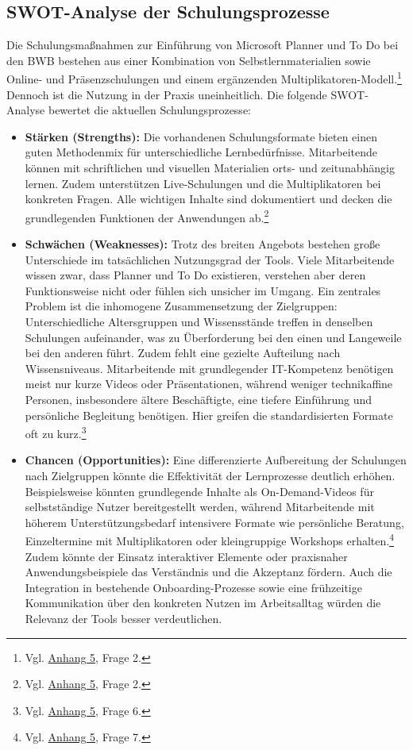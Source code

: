 \documentclass[
    12pt, 
    a4paper,
    ]{scrartcl} %
\begin{document}
\subsection{SWOT-Analyse der Schulungsprozesse}
Die Schulungsmaßnahmen zur Einführung von Microsoft Planner und To Do bei den BWB bestehen aus einer Kombination von Selbstlernmaterialien sowie Online- und Präsenzschulungen und einem ergänzenden Multiplikatoren-Modell.\footnote{Vgl. \hyperref[sec:Anhang5]{Anhang 5}, Frage 2.} Dennoch ist die Nutzung in der Praxis uneinheitlich. Die folgende SWOT-Analyse bewertet die aktuellen Schulungsprozesse:
\begin{itemize}
    \setlength\itemsep{0.4\baselineskip}
    \setlength\parskip{0pt}
    \setlength\parsep{0pt}
    \item \textbf{Stärken (Strengths):} Die vorhandenen Schulungsformate bieten einen guten Methodenmix für unterschiedliche Lernbedürfnisse. Mitarbeitende können mit schriftlichen und visuellen Materialien orts- und zeitunabhängig lernen. Zudem unterstützen Live-Schulungen und die Multiplikatoren bei konkreten Fragen. Alle wichtigen Inhalte sind dokumentiert und decken die grundlegenden Funktionen der Anwendungen ab.\footnote{Vgl. \hyperref[sec:Anhang5]{Anhang 5}, Frage 2.}
    \item \textbf{Schwächen (Weaknesses):} Trotz des breiten Angebots bestehen große Unterschiede im tatsächlichen Nutzungsgrad der Tools. Viele Mitarbeitende wissen zwar, dass Planner und To Do existieren, verstehen aber deren Funktionsweise nicht oder fühlen sich unsicher im Umgang. Ein zentrales Problem ist die inhomogene Zusammensetzung der Zielgruppen: Unterschiedliche Altersgruppen und Wissensstände treffen in denselben Schulungen aufeinander, was zu Überforderung bei den einen und Langeweile bei den anderen führt. Zudem fehlt eine gezielte Aufteilung nach Wissensniveaus. Mitarbeitende mit grundlegender IT-Kompetenz benötigen meist nur kurze Videos oder Präsentationen, während weniger technikaffine Personen, insbesondere ältere Beschäftigte, eine tiefere Einführung und persönliche Begleitung benötigen. Hier greifen die standardisierten Formate oft zu kurz.\footnote{Vgl. \hyperref[sec:Anhang5]{Anhang 5}, Frage 6.}
    \item \textbf{Chancen (Opportunities):} Eine differenzierte Aufbereitung der Schulungen nach Zielgruppen könnte die Effektivität der Lernprozesse deutlich erhöhen. Beispielsweise könnten grundlegende Inhalte als On-Demand-Videos für selbstständige Nutzer bereitgestellt werden, während Mitarbeitende mit höherem Unterstützungsbedarf intensivere Formate wie persönliche Beratung, Einzeltermine mit Multiplikatoren oder kleingruppige Workshops erhalten.\footnote{Vgl. \hyperref[sec:Anhang5]{Anhang 5}, Frage 7.} Zudem könnte der Einsatz interaktiver Elemente oder praxisnaher Anwendungsbeispiele das Verständnis und die Akzeptanz fördern. Auch die Integration in bestehende Onboarding-Prozesse sowie eine frühzeitige Kommunikation über den konkreten Nutzen im Arbeitsalltag würden die Relevanz der Tools besser verdeutlichen.

\end{itemize}
\end{document}
